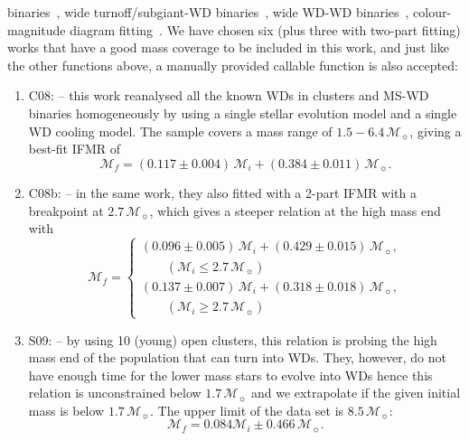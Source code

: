 \documentclass[fleqn,usenatbib]{rasti}
\newcommand{\msun}{\mathcal{M}_{\sun}}
\begin{document}
binaries~\citep{2008A&A...477..213C, 2012ApJ...746..144Z}, wide
turnoff/subgiant-WD binaries~\citep{2021ApJ...923..181B}, wide WD-WD
binaries~\citep{2015ASPC..493..325C, 2015ApJ...815...63A}, colour-magnitude
diagram fitting~\citep{2018ApJ...860L..17E}. We have chosen six (plus three
with two-part fitting) works that have a good mass coverage to be included
in this work, and just like the other functions above, a manually provided
callable function is also accepted:

\begin{enumerate}
    \item C08: \citet{2008MNRAS.387.1693C} -- this work reanalysed all the known WDs in clusters and MS-WD binaries homogeneously by using a single stellar evolution model and a single WD cooling model. The sample covers a mass range of $1.5-6.4\,\msun$, giving a best-fit IFMR of
    \begin{equation}
        \mathcal{M}_f = (0.117 \pm 0.004)\,\mathcal{M}_i + (0.384 \pm 0.011)\,\msun.
    \end{equation}
    \item C08b: \citet[][two-part]{2008MNRAS.387.1693C} -- in the same work, they also fitted with a 2-part IFMR with a breakpoint at $2.7\,\msun$, which gives a steeper relation at the high mass end with
    \begin{equation}
        \mathcal{M}_f = \begin{cases}
                  (0.096 \pm 0.005)\,\mathcal{M}_i + (0.429 \pm 0.015)\,\msun,\\
                  \qquad(\mathcal{M}_i \leq 2.7\,\msun)\\
                  (0.137 \pm 0.007)\,\mathcal{M}_i + (0.318 \pm 0.018)\,\msun,\\
                  \qquad(\mathcal{M}_i \geq 2.7\,\msun)
              \end{cases}
    \end{equation}
    \item S09: \citet{2009ApJ...692.1013S} -- by using 10 (young) open clusters, this relation is probing the high mass end of the population that can turn into WDs. They, however, do not have enough time for the lower mass stars to evolve into WDs hence this relation is unconstrained below $1.7\,\msun$ and we extrapolate if the given initial mass is below $1.7\,\msun$. The upper limit of the data set is $8.5\,\msun$:
    \begin{equation}
        \mathcal{M}_f = 0.084 \mathcal{M}_i \pm 0.466\,\msun.
    \end{equation}

\end{enumerate}
\end{document}
